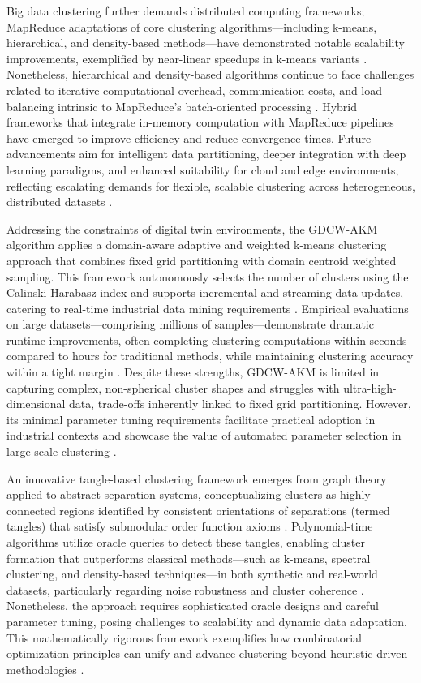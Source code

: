 \documentclass[11pt]{article}
\begin{document}
Big data clustering further demands distributed computing frameworks; MapReduce adaptations of core clustering algorithms—including k-means, hierarchical, and density-based methods—have demonstrated notable scalability improvements, exemplified by near-linear speedups in k-means variants \cite{ref16}. Nonetheless, hierarchical and density-based algorithms continue to face challenges related to iterative computational overhead, communication costs, and load balancing intrinsic to MapReduce’s batch-oriented processing \cite{ref16}. Hybrid frameworks that integrate in-memory computation with MapReduce pipelines have emerged to improve efficiency and reduce convergence times. Future advancements aim for intelligent data partitioning, deeper integration with deep learning paradigms, and enhanced suitability for cloud and edge environments, reflecting escalating demands for flexible, scalable clustering across heterogeneous, distributed datasets \cite{ref16}.

Addressing the constraints of digital twin environments, the GDCW-AKM algorithm applies a domain-aware adaptive and weighted k-means clustering approach that combines fixed grid partitioning with domain centroid weighted sampling. This framework autonomously selects the number of clusters using the Calinski-Harabasz index and supports incremental and streaming data updates, catering to real-time industrial data mining requirements \cite{ref20}. Empirical evaluations on large datasets—comprising millions of samples—demonstrate dramatic runtime improvements, often completing clustering computations within seconds compared to hours for traditional methods, while maintaining clustering accuracy within a tight margin \cite{ref20}. Despite these strengths, GDCW-AKM is limited in capturing complex, non-spherical cluster shapes and struggles with ultra-high-dimensional data, trade-offs inherently linked to fixed grid partitioning. However, its minimal parameter tuning requirements facilitate practical adoption in industrial contexts and showcase the value of automated parameter selection in large-scale clustering \cite{ref20}.

An innovative tangle-based clustering framework emerges from graph theory applied to abstract separation systems, conceptualizing clusters as highly connected regions identified by consistent orientations of separations (termed tangles) that satisfy submodular order function axioms \cite{ref13}. Polynomial-time algorithms utilize oracle queries to detect these tangles, enabling cluster formation that outperforms classical methods—such as k-means, spectral clustering, and density-based techniques—in both synthetic and real-world datasets, particularly regarding noise robustness and cluster coherence \cite{ref13}. Nonetheless, the approach requires sophisticated oracle designs and careful parameter tuning, posing challenges to scalability and dynamic data adaptation. This mathematically rigorous framework exemplifies how combinatorial optimization principles can unify and advance clustering beyond heuristic-driven methodologies \cite{ref13}.
\end{document}
